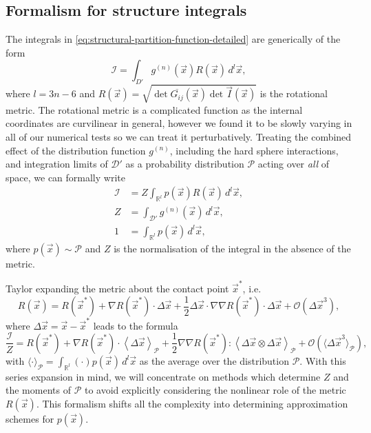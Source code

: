 \documentclass[11pt,twoside]{report}
\begin{document}
\subsection{Formalism for structure integrals}
\label{sec:analytic-integrals}

The integrals in \eqref{eq:structural-partition-function-detailed} are generically of the form
\begin{equation}\label{eq:schematic-partition-function}
  \mathcal{I}
  =
  \int_{D'}
  g^{(n)}(\vec{x}) R(\vec{x})
  \, d^l \vec{x},
\end{equation}
where $l = 3n - 6$ and $R(\vec{x}) = \sqrt{\det{\overline{G_{ij}}(\vec{x})} \det{\vec{I}(\vec{x})}}$ is the rotational metric.
The rotational metric is a complicated function as the internal coordinates are curvilinear in general, however we found it to be slowly varying in all of our numerical tests so we can treat it perturbatively.
Treating the combined effect of the distribution function $g^{(n)}$, including the hard sphere interactions, and integration limits of $\mathcal{D'}$ as a probability distribution $\mathcal{P}$ acting over \emph{all} of space, we can formally write
\begin{subequations}
  \begin{align}
    \mathcal{I}
    &=
    Z \int_{\mathbb{R}^l} p(\vec{x}) R(\vec{x}) \, d^l \vec{x},
    \\
    Z
    &=
    \int_{\mathcal{D}'} g^{(n)}(\vec{x}) \, d^l \vec{x},
    \\
    1
    &=
    \int_{\mathbb{R}^l} p(\vec{x}) \, d^l \vec{x},
  \end{align}
\end{subequations}
where $p(\vec{x}) \sim \mathcal{P}$ and $Z$ is the normalisation of the integral in the absence of the metric.

Taylor expanding the metric about the contact point $\vec{x}^*$, i.e.\
\begin{equation*}
  R(\vec{x})
  =
  R(\vec{x}^*)
  + \nabla R(\vec{x}^*) \cdot \Delta \vec{x}
  + \frac{1}{2} \Delta\vec{x} \cdot \nabla \nabla R(\vec{x}^*) \cdot \Delta\vec{x}
  + \mathcal{O}(\Delta\vec{x}^3),
\end{equation*}
where $\Delta \vec{x} = \vec{x} - \vec{x}^*$ leads to the formula
\begin{equation}\label{eq:rotation-metric-perturbations}
  \frac{\mathcal{I}}{Z}
  =
  R(\vec{x}^*)
  + \nabla R(\vec{x}^*) \cdot
  \left\langle \Delta \vec{x} \right\rangle_\mathcal{P}
  + \frac{1}{2} \nabla \nabla R(\vec{x}^*) :
  \left\langle \Delta\vec{x} \otimes \Delta\vec{x} \right\rangle_\mathcal{P}
  + \mathcal{O}(\langle \Delta\vec{x}^3 \rangle_\mathcal{P}),
\end{equation}
with $\langle \cdot \rangle_\mathcal{P} = \int_{\mathbb{R}^l} (\cdot) p(\vec{x}) \, d^l \vec{x}$ as the average over the distribution $\mathcal{P}$.
With this series expansion in mind, we will concentrate on methods which determine $Z$ and the moments of $\mathcal{P}$ to avoid explicitly considering the nonlinear role of the metric $R(\vec{x})$.
This formalism shifts all the complexity into determining approximation schemes for $p(\vec{x})$.
\end{document}
